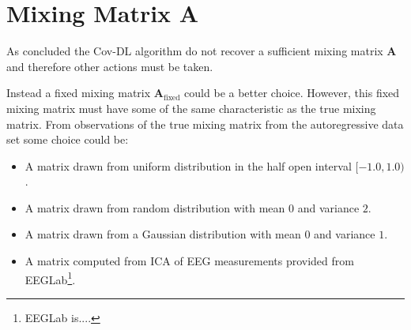 \section{Mixing Matrix A}
As concluded the Cov-DL algorithm do not recover a sufficient mixing matrix $\mathbf{A}$ and therefore other actions must be taken. 

Instead a fixed mixing matrix $\mathbf{A}_{\text{fixed}}$ could be a better choice. However, this fixed mixing matrix must have some of the same characteristic as the true mixing matrix. 
From observations of the true mixing matrix from the autoregressive data set some choice could be:
\begin{itemize}
\item A matrix drawn from uniform distribution in the half open interval $[-1.0, 1.0)$.
\item A matrix drawn from random distribution with mean $0$ and variance $2$.
\item A matrix drawn from a Gaussian distribution with mean $0$ and variance $1$.
\item A matrix computed from ICA of EEG measurements provided from EEGLab\footnote{EEGLab is....}.
\end{itemize}